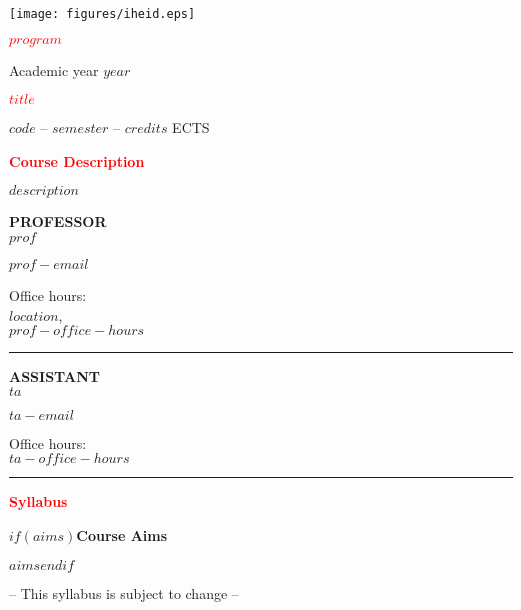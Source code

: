 \documentclass[11pt,a4paper]{article}
\author{$prof$}
\begin{document}
	

\hspace*{-1.25cm}
\texttt{[image: figures/iheid.eps]}
\vspace{0.25cm}


\begin{minipage}[t][98mm][t]{0.60\textwidth}
\textbf{\textcolor{red}{$program$}}

Academic year $year$
\vspace{0.25cm}

\textbf{\textcolor{red}{$title$}}

$code$ -- $semester$ -- $credits$ ECTS
\vspace{0.25cm}

\textbf{\textcolor{red}{Course Description}}

$description$
\vspace{0.25cm}
	\end{minipage}%
	\hspace{0.5cm}\vrule{}\hspace{0.5cm}
	\begin{minipage}[t][95mm][t]{0.30\textwidth}
	\begin{minipage}[t][37mm][t]{\textwidth}
	\textbf{PROFESSOR}\\
	
	$prof$
	
	\vspace{0.1cm}
	$prof-email$
	\vspace{0.1cm}
	
Office hours: \\
$location$,\\
$prof-office-hours$
	
	\end{minipage}
	\vspace{1cm}\hrule{}\vspace{0.5cm}
	\begin{minipage}[t][38mm][t]{\textwidth}
	\textbf{ASSISTANT}\\
	
	$ta$

	\vspace{0.1cm}
	$ta-email$
	\vspace{0.1cm}

Office hours: \\
$ta-office-hours$

	\end{minipage}
	\end{minipage}
	\hrule{}
	\vspace{0.5cm}
	
\textbf{\textcolor{red}{Syllabus}}	

$if(aims)$\textbf{Course Aims}

$aims$$endif$

	\centering
	-- This syllabus is subject to change --
	
\end{document}
